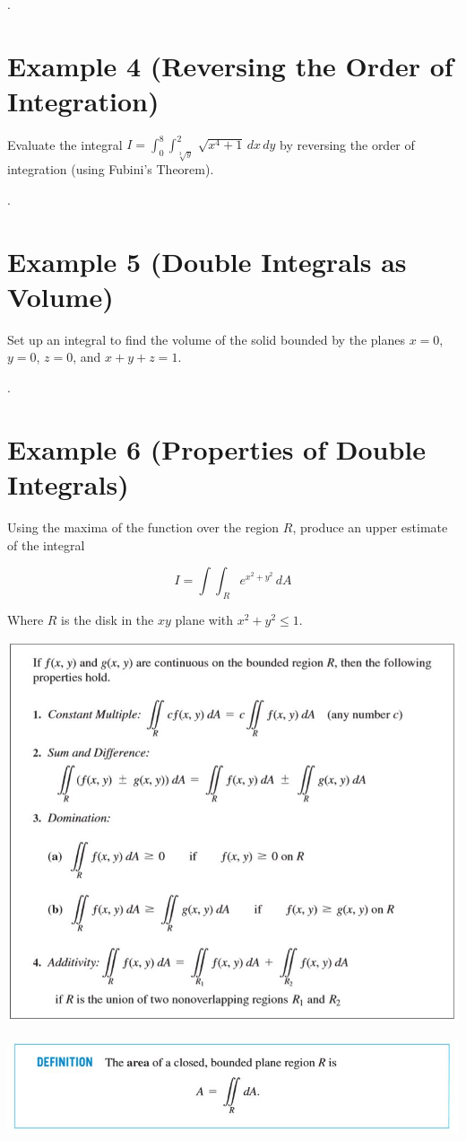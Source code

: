 \documentclass[11pt]{article}
\begin{document}
\newpage

.

\newpage

\section*{Example 4 (Reversing the Order of Integration)}

Evaluate the integral $I = \int_{0}^{8} \int_{\sqrt[3]{y}}^{2} \, \sqrt{x^4+1} \, dx \, dy$ by reversing the order of integration (using Fubini's Theorem). 




\newpage

.

\newpage

\section*{Example 5 (Double Integrals as Volume)}

Set up an integral to find the volume of the solid bounded by the planes $x=0$, $y=0$, $z=0$, and $x+y+z = 1$.



\newpage

.

\newpage


\section*{Example 6 (Properties of Double Integrals)}

Using the maxima of the function over the region $R$,
produce an upper estimate of the integral 

$$I = \int \int_{\; R} e^{x^2+y^2} \, dA$$

Where $R$ is the disk in the $xy$ plane with $x^2 + y^2 \leq 1$.

\includegraphics{Capture4.jpg}


\newpage

\includegraphics{Capture5.jpg}

\newpage
\end{document}
